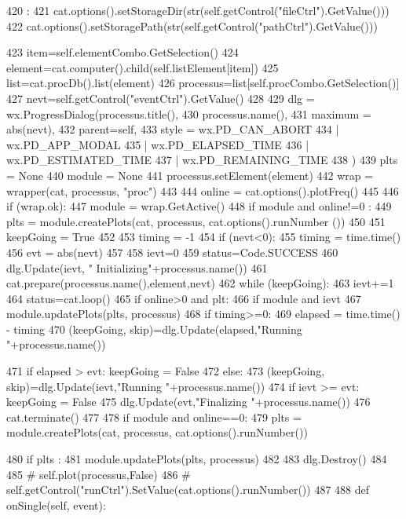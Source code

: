 \begin{DoxyCode}
420                             :
421         cat.options().setStorageDir(str(self.getControl("fileCtrl").GetValue()))
422         cat.options().setStoragePath(str(self.getControl("pathCtrl").GetValue()))
      
423         item=self.elementCombo.GetSelection()
424         element=cat.computer().child(self.listElement[item])
425         list=cat.procDb().list(element)
426         processus=list[self.procCombo.GetSelection()]
427         nevt=self.getControl("eventCtrl").GetValue()
428 
429         dlg = wx.ProgressDialog(processus.title(),
430                                 processus.name(),
431                                 maximum = abs(nevt),
432                                 parent=self,
433                                 style = wx.PD_CAN_ABORT
434                                 | wx.PD_APP_MODAL
435                                 | wx.PD_ELAPSED_TIME
436                                 | wx.PD_ESTIMATED_TIME
437                                 | wx.PD_REMAINING_TIME
438                                 )
439         plts   = None
440         module = None
441         processus.setElement(element)
442         wrap = wrapper(cat, processus, "proc")
443 
444         online  = cat.options().plotFreq()
445         
446         if (wrap.ok):
447             module = wrap.GetActive()
448             if module and online!=0 :
449                 plts = module.createPlots(cat, processus, cat.options().runNumber
      ())        
450 
451         keepGoing = True
452 
453         timing = -1
454         if (nevt<0):
455             timing = time.time()
456         evt    = abs(nevt)
457 
458         ievt=0 
459         status=Code.SUCCESS
460         dlg.Update(ievt, " Initializing"+processus.name())
461         cat.prepare(processus.name(),element,nevt)
462         while (keepGoing):
463             ievt+=1
464             status=cat.loop()
465             if online>0 and plt:
466                 if module and ievt%
467                     module.updatePlots(plts, processus)
468             if timing>=0:
469                 elapsed = time.time() - timing
470                 (keepGoing, skip)=dlg.Update(elapsed,"Running "+processus.name())
      
471                 if elapsed > evt: keepGoing = False
472             else:
473                 (keepGoing, skip)=dlg.Update(ievt,"Running "+processus.name())
474                 if ievt >= evt: keepGoing = False
475         dlg.Update(evt,"Finalizing "+processus.name())
476         cat.terminate()
477 
478         if module and online==0:
479             plts = module.createPlots(cat, processus, cat.options().runNumber()) 
             
480             if plts :
481                 module.updatePlots(plts, processus)
482         
483         dlg.Destroy()
484         
485 #        self.plot(processus,False)
486 #        self.getControl("runCtrl").SetValue(cat.options().runNumber())
487                 
488         
    def onSingle(self, event):
\end{DoxyCode}

